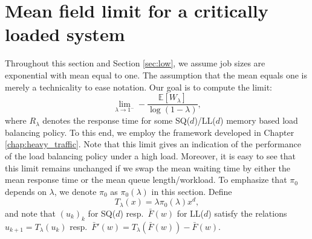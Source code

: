 \documentclass[12pt]{report}
\newcommand{\E}{\mathbb{E}}
\begin{document}
\section{Mean field limit for a critically loaded system}\label{sec:heavy}
Throughout this section and Section \ref{sec:low}, we assume job sizes are exponential with mean equal to one. The assumption that the mean equals one is merely a technicality to ease notation. Our goal is to compute the limit:
\begin{equation}\label{eq:heavy_traffic_mem}
\lim_{\lambda \rightarrow 1^-} -\frac{\E[W_\lambda]}{\log(1-\lambda)},
\end{equation}
where $R_{\lambda}$ denotes the response time for some SQ($d$)/LL($d$) memory based load balancing policy. To this end, we employ the framework developed in Chapter \ref{chap:heavy_traffic}. Note that this limit gives an indication of the performance of the load balancing policy under a high load. Moreover, it is easy to see that this limit remains unchanged if we swap the mean waiting time by either the mean response time or the mean queue length/workload.
To emphasize that $\pi_0$ depends on $\lambda$, we denote $\pi_0$ as $\pi_0(\lambda)$
in this section. Define
\begin{equation}\label{eq:T_lam_mem}
T_{\lambda}(x) = \lambda \pi_0(\lambda) x^d,
\end{equation}
and note that $(u_k)_k$ for SQ($d$) resp.~$\bar F(w)$ for LL($d$) satisfy the relations $u_{k+1} = T_{\lambda}(u_k)$ resp.~$\bar F'(w)=T_{\lambda}(\bar F(w)) - \bar F(w)$. 
\end{document}
